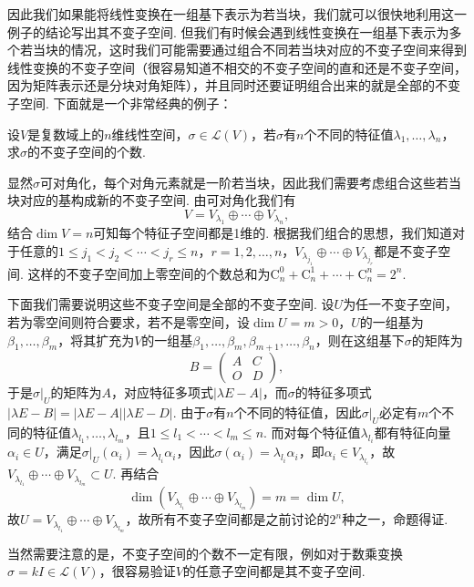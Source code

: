 因此我们如果能将线性变换在一组基下表示为若当块，我们就可以很快地利用这一例子的结论写出其不变子空间. 但我们有时候会遇到线性变换在一组基下表示为多个若当块的情况，这时我们可能需要通过组合不同若当块对应的不变子空间来得到线性变换的不变子空间（很容易知道不相交的不变子空间的直和还是不变子空间，因为矩阵表示还是分块对角矩阵），并且同时还要证明组合出来的就是全部的不变子空间. 下面就是一个非常经典的例子：
\begin{example}{}{}
    设$V$是复数域上的$n$维线性空间，$\sigma\in\mathcal{L}(V)$，若$\sigma$有$n$个不同的特征值$\lambda_1,\ldots,\lambda_n$，求$\sigma$的不变子空间的个数.
\end{example}
\begin{solution}
    显然$\sigma$可对角化，每个对角元素就是一阶若当块，因此我们需要考虑组合这些若当块对应的基构成新的不变子空间. 由可对角化我们有
    \[V=V_{\lambda_1}\oplus\cdots\oplus V_{\lambda_n},\]
    结合$\dim V=n$可知每个特征子空间都是1维的. 根据我们组合的思想，我们知道对于任意的$1\leqslant j_1<j_2<\cdots<j_r\leqslant n$，$r=1,2,\ldots,n$，$V_{\lambda_{j_1}}\oplus\cdots\oplus V_{\lambda_{j_r}}$都是不变子空间. 这样的不变子空间加上零空间的个数总和为$\mathrm{C}_n^0+\mathrm{C}_n^1+\cdots+\mathrm{C}_n^n=2^n$.

    下面我们需要说明这些不变子空间是全部的不变子空间. 设$U$为任一不变子空间，若为零空间则符合要求，若不是零空间，设$\dim U=m>0$，$U$的一组基为$\beta_1,\ldots,\beta_m$，将其扩充为$V$的一组基$\beta_1,\ldots,\beta_m,\beta_{m+1},\ldots,\beta_n$，则在这组基下$\sigma$的矩阵为
    \[B=\begin{pmatrix}
            A & C \\ O & D
        \end{pmatrix},\]
    于是$\sigma\vert_U$的矩阵为$A$，对应特征多项式$|\lambda E-A|$，而$\sigma$的特征多项式$|\lambda E-B|=|\lambda E-A||\lambda E-D|$. 由于$\sigma$有$n$个不同的特征值，因此$\sigma\vert_U$必定有$m$个不同的特征值$\lambda_{l_1},\ldots,\lambda_{l_m}$，且$1\leqslant l_1<\cdots<l_m\leqslant n$. 而对每个特征值$\lambda_{l_i}$都有特征向量$\alpha_i\in U$，满足$\sigma\vert_U(\alpha_i)=\lambda_{l_i}\alpha_i$，因此$\sigma(\alpha_i)=\lambda_{l_i}\alpha_i$，即$\alpha_i\in V_{\lambda_{l_i}}$，故$V_{\lambda_{l_1}}\oplus\cdots\oplus V_{\lambda_{l_m}}\subset U$. 再结合
    \[\dim(V_{\lambda_{l_1}}\oplus\cdots\oplus V_{\lambda_{l_m}})=m=\dim U,\]
    故$U=V_{\lambda_{l_1}}\oplus\cdots\oplus V_{\lambda_{l_m}}$，故所有不变子空间都是之前讨论的$2^n$种之一，命题得证.
\end{solution}

当然需要注意的是，不变子空间的个数不一定有限，例如对于数乘变换$\sigma=kI\in\mathcal{L}(V)$，很容易验证$V$的任意子空间都是其不变子空间.

